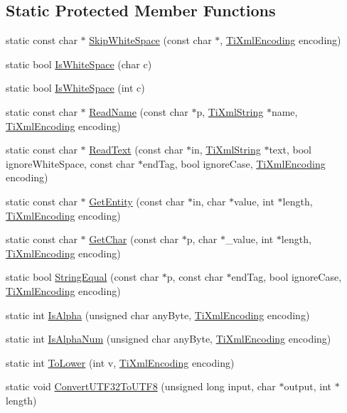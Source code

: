 \subsection*{Static Protected Member Functions}
\begin{DoxyCompactItemize}
\item 
static const char $\ast$ \hyperlink{class_ti_xml_base_ac0c3d66d8a9e6996a1fa016275e16875}{SkipWhiteSpace} (const char $\ast$, \hyperlink{tinyxml_8h_a88d51847a13ee0f4b4d320d03d2c4d96}{TiXmlEncoding} encoding)
\item 
static bool \hyperlink{class_ti_xml_base_af56296d561c0bab4bc8e198cdcf5c48e}{IsWhiteSpace} (char c)
\item 
static bool \hyperlink{class_ti_xml_base_a3de391ea9f4c4a8aa10d04480b048795}{IsWhiteSpace} (int c)
\item 
static const char $\ast$ \hyperlink{class_ti_xml_base_a7f0ad64390126a89401e93265e98db50}{ReadName} (const char $\ast$p, \hyperlink{class_ti_xml_string}{TiXmlString} $\ast$name, \hyperlink{tinyxml_8h_a88d51847a13ee0f4b4d320d03d2c4d96}{TiXmlEncoding} encoding)
\item 
static const char $\ast$ \hyperlink{class_ti_xml_base_a54a6120fef03cfd91e341ea63be4d62d}{ReadText} (const char $\ast$in, \hyperlink{class_ti_xml_string}{TiXmlString} $\ast$text, bool ignoreWhiteSpace, const char $\ast$endTag, bool ignoreCase, \hyperlink{tinyxml_8h_a88d51847a13ee0f4b4d320d03d2c4d96}{TiXmlEncoding} encoding)
\item 
static const char $\ast$ \hyperlink{class_ti_xml_base_ac5c08bf3deffcda0bf8ce2958372b584}{GetEntity} (const char $\ast$in, char $\ast$value, int $\ast$length, \hyperlink{tinyxml_8h_a88d51847a13ee0f4b4d320d03d2c4d96}{TiXmlEncoding} encoding)
\item 
static const char $\ast$ \hyperlink{class_ti_xml_base_a5b0fde72d6f662ae1fd6303195d2159b}{GetChar} (const char $\ast$p, char $\ast$\_\-value, int $\ast$length, \hyperlink{tinyxml_8h_a88d51847a13ee0f4b4d320d03d2c4d96}{TiXmlEncoding} encoding)
\item 
static bool \hyperlink{class_ti_xml_base_a51631e6986179558b9e5850723ed165a}{StringEqual} (const char $\ast$p, const char $\ast$endTag, bool ignoreCase, \hyperlink{tinyxml_8h_a88d51847a13ee0f4b4d320d03d2c4d96}{TiXmlEncoding} encoding)
\item 
static int \hyperlink{class_ti_xml_base_ae22522b2e8e1ac43102d16394f639fc8}{IsAlpha} (unsigned char anyByte, \hyperlink{tinyxml_8h_a88d51847a13ee0f4b4d320d03d2c4d96}{TiXmlEncoding} encoding)
\item 
static int \hyperlink{class_ti_xml_base_a321919055c115c78ded17f85a793f368}{IsAlphaNum} (unsigned char anyByte, \hyperlink{tinyxml_8h_a88d51847a13ee0f4b4d320d03d2c4d96}{TiXmlEncoding} encoding)
\item 
static int \hyperlink{class_ti_xml_base_a799f17405a86a5c2029618e85f11a097}{ToLower} (int v, \hyperlink{tinyxml_8h_a88d51847a13ee0f4b4d320d03d2c4d96}{TiXmlEncoding} encoding)
\item 
static void \hyperlink{class_ti_xml_base_a07c765e3a7f979d343e646ea797b180b}{ConvertUTF32ToUTF8} (unsigned long input, char $\ast$output, int $\ast$length)
\end{DoxyCompactItemize}
